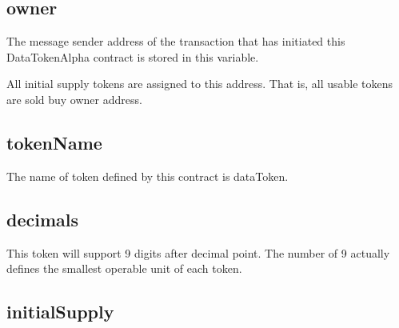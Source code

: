 \documentclass[letterpaper,10pt,english]{sphinxmanual}
\begin{document}
\subsection{owner}
\label{\detokenize{ContractVariables:owner}}
%
\begin{sphinxVerbatim}[commandchars=\\\{\}]
 
\end{sphinxVerbatim}

The message sender address of the transaction that has initiated this
DataTokenAlpha contract is stored in this variable.

All initial supply tokens are assigned to this address.
That is, all usable tokens are sold buy owner address.


\subsection{tokenName}
\label{\detokenize{ContractVariables:tokenname}}
%
\begin{sphinxVerbatim}[commandchars=\\\{\}]
    
\end{sphinxVerbatim}

The name of token defined by this contract is dataToken.


\subsection{decimals}
\label{\detokenize{ContractVariables:decimals}}
%
\begin{sphinxVerbatim}[commandchars=\\\{\}]
    
\end{sphinxVerbatim}

This token will support 9 digits after decimal point.
The number of 9 actually defines the smallest operable unit of each token.


\subsection{initialSupply}
\label{\detokenize{ContractVariables:initialsupply}}
%
\begin{sphinxVerbatim}[commandchars=\\\{\}]
   
\end{sphinxVerbatim}
\end{document}
